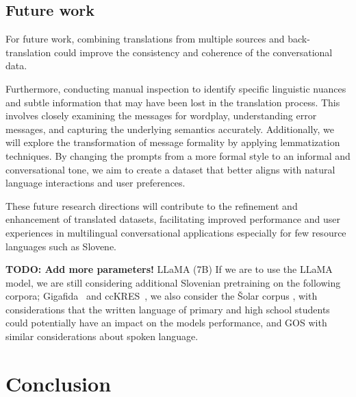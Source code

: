 \documentclass[fleqn,moreauthors,10pt]{ds_report}
\begin{document}
    \subsection*{Future work}
    For future work, combining translations from multiple sources and back-translation could improve the consistency and coherence of the conversational data.
    
    Furthermore, conducting manual inspection to identify specific linguistic nuances and subtle information that may have been lost in the translation process. This involves closely examining the messages for wordplay, understanding error messages, and capturing the underlying semantics accurately. 
    Additionally, we will explore the transformation of message formality by applying lemmatization techniques. By changing the prompts from a more formal style to an informal and conversational tone, we aim to create a dataset that better aligns with natural language interactions and user preferences.
    
    These future research directions will contribute to the refinement and enhancement of translated datasets, facilitating improved performance and user experiences in multilingual conversational applications especially for few resource languages such as Slovene.
    
    \textbf{TODO: Add more parameters!}
    LLaMA (7B)
     If we are to use the LLaMA model, we are still considering additional Slovenian pretraining on the following corpora; Gigafida~\cite{11356/1320} and ccKRES~\cite{ccKres}, we also consider the Šolar corpus \cite{kosem2011slovenian}, with considerations that the written language of primary and high school students could potentially have an impact on the models performance, and GOS \cite{Verdonik2013} with similar considerations about spoken language.



\section*{Conclusion}








\end{document}
